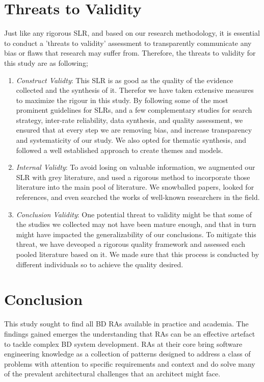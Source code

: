 \documentclass[review]{elsarticle}
\begin{document}
\section{Threats to Validity}

Just like any rigorous SLR, and based on our research methodology, it is essential to conduct a 'threats to validity' assessment to transparently communicate any bias or flaws that research may suffer from. Therefore, the threats to validity for this study are as following;

\begin{enumerate}
    \item \emph{Construct Validty}: This SLR is as good as the quality of the evidence collected and the synthesis of it. Therefor we have taken extensive measures to maximize the rigour in this study. By following some of the most prominent guidelines for SLRs, and a few complementary studies for search strategy, inter-rate reliability, data synthesis, and quality assessment, we ensured that at every step we are removing bias, and increase transparency and systematicity of our study. We also opted for thematic synthesis, and followed a well established approach to create themes and models.
    \item \emph{Internal Validty}: To avoid losing on valuable information, we augmented our SLR with grey literature, and used a rigorous method to incorporate those literature into the main pool of literature. We snowballed papers, looked for references, and even searched the works of well-known researchers in the field. 
    \item \emph{Conclusion Validity}: One potential threat to validity might be that some of the studies we collected may not have been mature enough, and that in turn might have impacted the generalizability of our conclusions. To mitigate this threat, we have deveoped a rigorous quality framework and assessed each pooled literature based on it. We made sure that this process is conducted by different individuals so to achieve the quality desired. 
\end{enumerate}

\section{Conclusion}

This study sought to find all BD RAs available in practice and academia. The findings gained emerges the understanding that RAs can be an effective artefact to tackle complex BD system development. RAs at their core bring software engineering knowledge as a collection of patterns designed to address a class of problems with attention to specific requirements and context and do solve many of the prevalent architectural challenges that an architect might face. 
\end{document}
